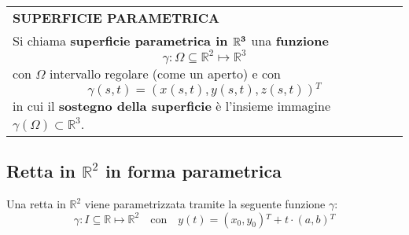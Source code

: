 \documentclass[a4paper]{extarticle}
\renewcommand\arraystretch{}
\begin{document}
\vspace{1em}
\setlength{\tabcolsep}{14pt}
\renewcommand{\arraystretch}{2}
\noindent
\begin{tabularx}{\textwidth}{@{}|P|@{}}
    \hline
    {\textbf{SUPERFICIE PARAMETRICA}}\\
    \parbox{\linewidth}{Si chiama \textbf{superficie parametrica in $\bf{\mathbb{R}^3}$} una \textbf{funzione}
    \[\gamma : \Omega \subseteq \mathbb{R}^2 \longmapsto \mathbb{R}^3\]
    con $\Omega$ intervallo regolare (come un aperto) e con
    \[\gamma(s,t) = \left(x(s,t),y(s,t),z(s,t)\right){^T}\]
    in cui il \textbf{sostegno della superficie} è l'insieme immagine $\gamma(\Omega) \subset \mathbb{R}^3$. \vspace{3mm}}\\
    \hline
\end{tabularx}

\vspace{2em}
\noindent
\subsection{Retta in $\mathbb{R}^2$ in forma parametrica}
Una retta in $\mathbb{R}^2$ viene parametrizzata tramite la seguente funzione $\gamma$:
\[\gamma : I \subseteq \mathbb{R} \longmapsto \mathbb{R}^2 \hspace{1em} \text{con} \hspace{1em} y(t) = (x_0,y_0){^T} + t \cdot (a,b){^T}\]
\end{document}
